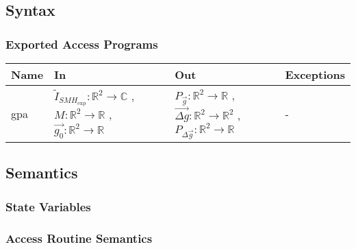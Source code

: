 \documentclass[12pt, titlepage]{article}
\begin{document}
\subsection{Syntax}

\subsubsection{Exported Access Programs}

\begin{center}
\begin{tabular}{p{2cm} p{4cm} p{4cm} p{2cm}}
\hline
\textbf{Name} & \textbf{In} & \textbf{Out} & \textbf{Exceptions} \\
\hline
gpa & $\widetilde{I}_{\mathit{SMH}_{\text{exp}}}:\mathbb{R}^2\rightarrow\mathbb{C}$ , $M:\mathbb{R}^2\rightarrow\mathbb{R}$ , $\overrightarrow{g_0} :\mathbb{R}^2\rightarrow\mathbb{R}$ & $P_{\vec{g}}:\mathbb{R}^2\rightarrow\mathbb{R}$ , $\overrightarrow{\Delta g}:\mathbb{R}^2\rightarrow\mathbb{R}^2$ , $P_{\Delta \vec{g}}:\mathbb{R}^2\rightarrow\mathbb{R}$ & - \\
\hline
\end{tabular}
\end{center}

\subsection{Semantics}

\subsubsection{State Variables}


\subsubsection{Access Routine Semantics}
\end{document}
